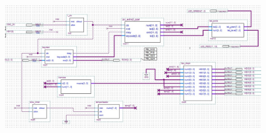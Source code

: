 \documentclass[12pt, a4papre]{article}
\begin{document}
	\begin{figure}[H]
	
				\begin{center}
		\includegraphics[width=130mm]{JocExtraPlaca.jpeg}
		\end{center}
	\end{figure}

	
	
\end{document}
